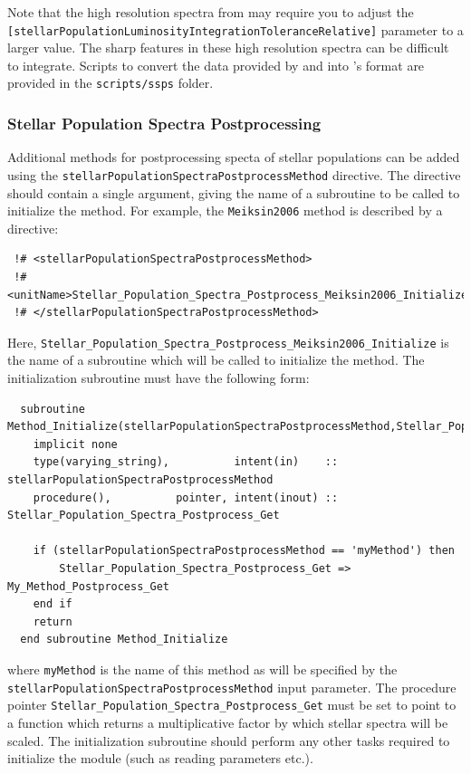 Note that the high resolution spectra from \cite{bruzual_stellar_2003} may require you to adjust the {\tt [stellarPopulationLuminosityIntegrationToleranceRelative]} parameter to a larger value. The sharp features in these high resolution spectra can be difficult to integrate. Scripts to convert the data provided by \cite{maraston_evolutionary_2005} and \cite{bruzual_stellar_2003} into \glc's format are provided in the {\tt scripts/ssps} folder.

\subsubsection{Stellar Population Spectra Postprocessing}

Additional methods for postprocessing specta of stellar populations can be added using the {\tt stellarPopulationSpectraPostprocessMethod} directive. The directive should contain a single argument, giving the name of a subroutine to be called to initialize the method. For example, the {\tt Meiksin2006} method is described by a directive:
\begin{verbatim}
 !# <stellarPopulationSpectraPostprocessMethod>
 !#  <unitName>Stellar_Population_Spectra_Postprocess_Meiksin2006_Initialize</unitName>
 !# </stellarPopulationSpectraPostprocessMethod>
\end{verbatim}
Here, {\tt Stellar\_Population\_Spectra\_Postprocess\_Meiksin2006\_Initialize} is the name of a subroutine which will be called to initialize the method. The initialization subroutine must have the following form:
\begin{verbatim}
  subroutine Method_Initialize(stellarPopulationSpectraPostprocessMethod,Stellar_Population_Spectra_Postprocess_Get)
    implicit none
    type(varying_string),          intent(in)    :: stellarPopulationSpectraPostprocessMethod
    procedure(),          pointer, intent(inout) :: Stellar_Population_Spectra_Postprocess_Get
    
    if (stellarPopulationSpectraPostprocessMethod == 'myMethod') then
        Stellar_Population_Spectra_Postprocess_Get => My_Method_Postprocess_Get
    end if
    return
  end subroutine Method_Initialize
\end{verbatim}
where {\tt myMethod} is the name of this method as will be specified by the {\tt stellarPopulationSpectraPostprocessMethod} input parameter. The procedure pointer {\tt Stellar\_Population\_Spectra\_Postprocess\_Get} must be set to point to a function which returns a multiplicative factor by which stellar spectra will be scaled. The initialization subroutine should perform any other tasks required to initialize the module (such as reading parameters etc.).

